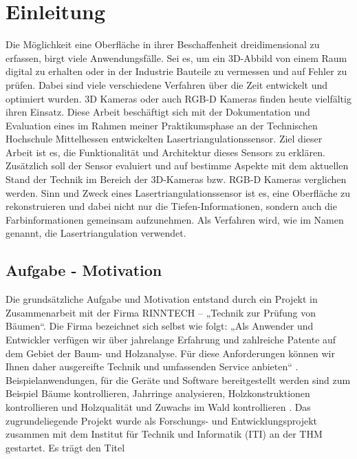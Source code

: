 \section{Einleitung}\label{einleitung}
Die Möglichkeit eine Oberfläche in ihrer Beschaffenheit dreidimensional zu erfassen, birgt viele Anwendungsfälle. Sei es, um ein 3D-Abbild von einem Raum digital zu erhalten oder in der Industrie Bauteile zu vermessen und auf Fehler zu prüfen. Dabei sind viele verschiedene Verfahren über die Zeit entwickelt und optimiert wurden. 3D Kameras oder auch RGB-D Kameras finden heute vielfältig ihren Einsatz. Diese Arbeit beschäftigt sich mit der Dokumentation und Evaluation eines im Rahmen meiner Praktikumsphase an der Technischen Hochschule Mittelhessen entwickelten Lasertriangulationssensor. Ziel dieser Arbeit ist es, die Funktionalität und Architektur dieses Sensors zu erklären. Zusätzlich soll der Sensor evaluiert und auf bestimme Aspekte mit dem aktuellen Stand der Technik im Bereich der 3D-Kameras bzw. RGB-D Kameras verglichen werden.
Sinn und Zweck eines Lasertriangulationssensor ist es, eine Oberfläche zu rekonstruieren und dabei nicht nur die Tiefen-Informationen, sondern auch die Farbinformationen gemeinsam aufzunehmen. Als Verfahren wird, wie im Namen genannt, die Lasertriangulation verwendet.

	\subsection{Aufgabe - Motivation}
	Die grundsätzliche Aufgabe und Motivation entstand durch ein Projekt in Zusammenarbeit mit der Firma RINNTECH – „Technik zur Prüfung von Bäumen“. Die Firma bezeichnet sich selbst wie folgt: „Als Anwender und Entwickler verfügen wir über jahrelange Erfahrung und zahlreiche Patente auf dem Gebiet der Baum- und Holzanalyse. Für diese Anforderungen können wir Ihnen daher ausgereifte Technik und umfassenden Service anbieten“ \citep[Vgl.][]{noauthor_rinntech_nodate}. Beispielanwendungen, für die Geräte und Software bereitgestellt werden sind zum Beispiel Bäume kontrollieren, Jahrringe analysieren, Holzkonstruktionen kontrollieren und Holzqualität und Zuwachs im Wald kontrollieren \citep[Vgl.][]{noauthor_rinntech_nodate}. Das zugrundeliegende Projekt wurde als Forschungs- und Entwicklungsprojekt zusammen mit dem Institut für Technik und Informatik (ITI) an der THM gestartet. Es trägt den Titel
	
